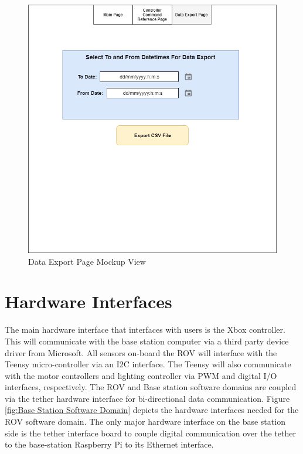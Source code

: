 \documentclass{scrreprt}
\begin{document}
\begin{figure}[!ht]
    \centering
    \includegraphics[scale=0.45]{DataExportPageMockup.png}
    \caption{Data Export Page Mockup View}
    \label{fig:Data Export Page Mockup View}
\end{figure}
\FloatBarrier


\section{Hardware Interfaces}
The main hardware interface that interfaces with users is the Xbox controller. This will communicate with the base station computer via a third party device driver from Microsoft. All sensors on-board the ROV will interface with the Teensy micro-controller via an I2C interface. The Teensy will also communicate with the motor controllers and lighting controller via PWM and digital I/O interfaces, respectively. The ROV and Base station software domains are coupled via the tether hardware interface for bi-directional data communication. Figure \ref{fig:Base Station Software Domain} depicts the hardware interfaces needed for the ROV software domain. The only major hardware interface on the base station side is the tether interface board to couple digital communication over the tether to the base-station Raspberry Pi to its Ethernet interface. 
\end{document}
